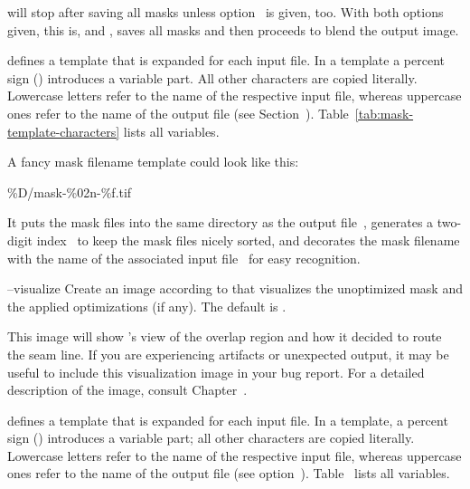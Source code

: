 \begin{codelist}
  \begin{sloppypar}
    \App{} will stop after saving all masks unless
    option~ is given, too.  With both options given,
    this is,  and , \App{} saves
    all masks and then proceeds to blend the output image.
  \end{sloppypar}

  \begin{geeknote}
     defines a template that is expanded for
    each input file.  In a template a percent sign (\sample{\%})
    introduces a variable part.  All other characters are copied
    literally.  Lowercase letters refer to the name of the respective
    input file, whereas uppercase ones refer to the name of the output
    file (see Section~).
    Table~\ref{tab:mask-template-characters} lists all variables.

    A fancy mask filename template could look like this:

    \begin{literal}
      \%D/mask-\%02n-\%f.tif
    \end{literal}

    It puts the mask files into the same directory as the output
    file~, generates a two-digit index~ to
    keep the mask files nicely sorted, and decorates the mask filename
    with the name of the associated input file~ for easy
    recognition.
  \end{geeknote}


  \label{opt:visualize}%
\item[--visualize\optional{=\metavar{VISUALIZE-TEMPLATE}}]\itemend
  Create an image according to  that
  visualizes%
   the
  unoptimized mask and the applied optimizations (if any).  The
  default is \mbox{}.

  This image will show \App{}'s view of the overlap region and how it
  decided to route the seam line.  If you are experiencing artifacts
  or unexpected output, it may be useful to include this visualization
  image in your bug report.  For a detailed description of the image,
  consult Chapter~.

  \begin{geeknote}
     defines a template that is expanded
    for each input file.  In a template, a percent sign (\sample{\%})
    introduces a variable part; all other characters are copied
    literally.  Lowercase letters refer to the name of the respective
    input file, whereas uppercase ones refer to the name of the output
    file (see option~).
    Table~ lists all variables.
  \end{geeknote}
\end{codelist}





